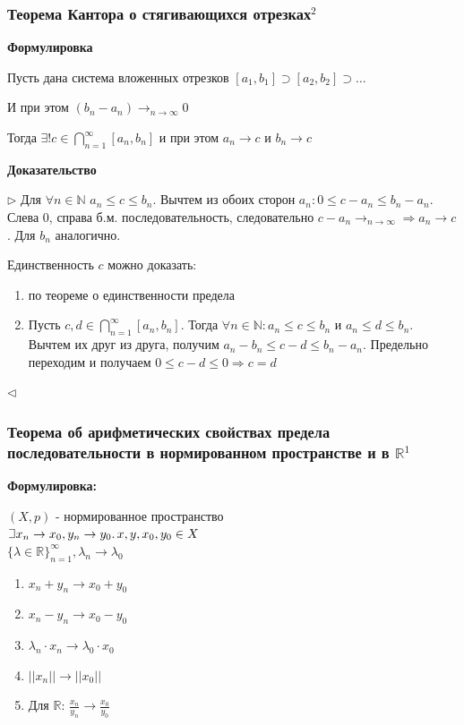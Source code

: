 \documentclass{article}
\def\letus{%
\mathord{\setbox0=\hbox{$\exists$}%
         \hbox{\kern 0.125\wd0%
               \vbox to \ht0{%
                  \hrule width 0.75\wd0%
                  \vfill%
                  \hrule width 0.75\wd0}%
               \vrule height \ht0%
               \kern 0.125\wd0}%
       }%
        }
\def\dbl{\,\,}
\begin{document}
\subsubsection{Теорема Кантора о стягивающихся отрезках\texorpdfstring{$^2$}{}}

\textbf{Формулировка}

Пусть дана система вложенных отрезков $[a_1, b_1] \supset [a_2, b_2] \supset \ldots$

И при этом $(b_n - a_n) \rightarrow_{n \rightarrow \infty} 0$

Тогда $\exists ! c \in \bigcap_{n = 1}^\infty{[a_n, b_n]}$ и при этом $a_n \rightarrow c$ и $b_n \rightarrow c$

\textbf{Доказательство}

$\rhd$ Для $\forall n \in \mathbb{N} \dbl a_n \le c \le b_n$. Вычтем из обоих сторон $a_n : 0 \le c - a_n \le b_n - a_n$. Слева 0, справа б.м. последовательность, следовательно $c - a_n \rightarrow_{n \rightarrow \infty} \Rightarrow a_n \rightarrow c$. Для $b_n$ аналогично.

Единственность $c$ можно доказать:
\begin{enumerate}
    \item по теореме о единственности предела
    \item Пусть $c, d \in \bigcap_{n = 1}^\infty{[a_n, b_n]}$. Тогда $\forall n \in \mathbb{N} : a_n \le c \le b_n$ и $a_n \le d \le b_n$. Вычтем их друг из друга, получим $a_n - b_n \le c - d \le b_n - a_n$. Предельно переходим и получаем $0 \le c - d \le 0 \Rightarrow c = d$
\end{enumerate}
$\lhd$


\subsubsection{Теорема об арифметических свойствах предела последовательности в нормированном пространстве и в \texorpdfstring{$\mathbb{R}$}{R}\texorpdfstring{$^1$}{}}

\textbf{Формулировка:}

$(X, p)$ - нормированное пространство\\
$\letus x_n \rightarrow x_0, y_n \rightarrow y_0.\, x, y, x_0, y_0 \in X$\\
$\{\lambda\in \mathbb{R}\}_{n=1}^\infty, \lambda_n \rightarrow \lambda_0$
\begin{enumerate}
    \item $x_n + y_n \rightarrow x_0 + y_0$
    \item $x_n - y_n \rightarrow x_0 - y_0$
    \item $\lambda_n \cdot x_n \rightarrow \lambda_0 \cdot x_0$
    \item $||x_n|| \rightarrow ||x_0||$
    \item Для $\mathbb{R}$: $\frac{x_n}{y_n} \rightarrow \frac{x_0}{y_0}$
\end{enumerate}
\end{document}
